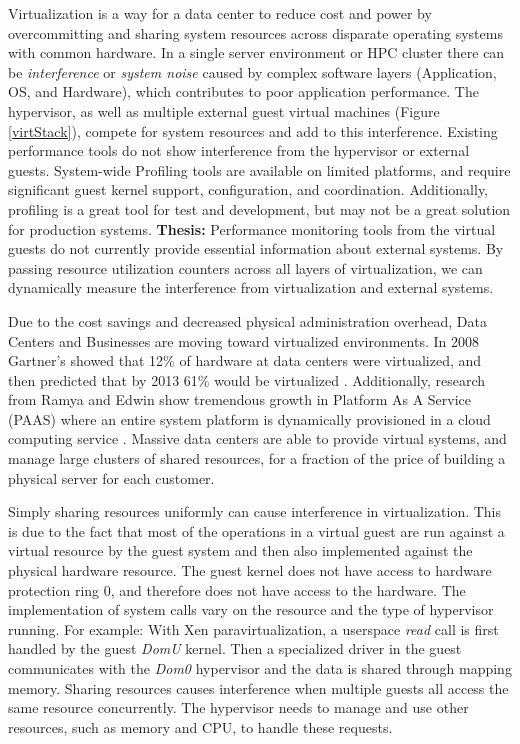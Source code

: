 Virtualization is a way for a data center to reduce cost and power by overcommitting and sharing system resources across disparate operating systems with common hardware.  
In a single server environment or HPC cluster there can be \emph{interference} \cite{paul} or \emph{system noise}\cite{tsafrir} caused by complex software layers (Application, OS, and Hardware), which contributes to poor application performance.  
The hypervisor, as well as multiple external guest virtual machines (Figure \ref{virtStack}), compete for system resources and add to this interference.  
Existing performance tools do not show interference from the hypervisor or external guests.  
System-wide Profiling tools are available on limited platforms, and require significant guest kernel support, configuration, and coordination.  
Additionally, profiling is a great tool for test and development, but may not be a great solution for production systems.
\textbf{Thesis:  }Performance monitoring tools from the virtual guests do not currently provide essential information about external systems.  By passing resource utilization counters across all layers of virtualization, we can dynamically measure the interference from virtualization and external systems.

\indent Due to the cost savings and decreased physical administration overhead, Data Centers and Businesses are moving toward virtualized environments.  In 2008 Gartner’s showed that 12\% of hardware at data centers were virtualized, and then predicted that by 2013 61\% would be virtualized \cite{gartners}.   Additionally, research from Ramya and Edwin show tremendous growth in Platform As A Service (PAAS) where an entire system platform is dynamically provisioned in a cloud computing service \cite{ramya}.   Massive data centers are able to provide virtual systems, and manage large clusters of shared resources, for a fraction of the price of building a physical server for each customer.

\indent Simply sharing resources uniformly can cause interference in virtualization.  This is due to the fact that most of the operations in a virtual guest are run against a virtual resource by the guest system and then also implemented against the physical hardware resource.  The guest kernel does not have access to hardware protection ring 0, and therefore does not have access to the hardware.  The implementation of system calls vary on the resource and the type of hypervisor running.  For example:  With Xen paravirtualization, a userspace \emph{read} call is first handled by the guest \emph{DomU} kernel.  Then a specialized driver in the guest communicates with the \emph{Dom0} hypervisor and the data is shared through mapping memory.  Sharing resources causes interference when multiple guests all access the same resource concurrently.  The hypervisor needs to manage and use other resources, such as memory and CPU, to handle these requests.

